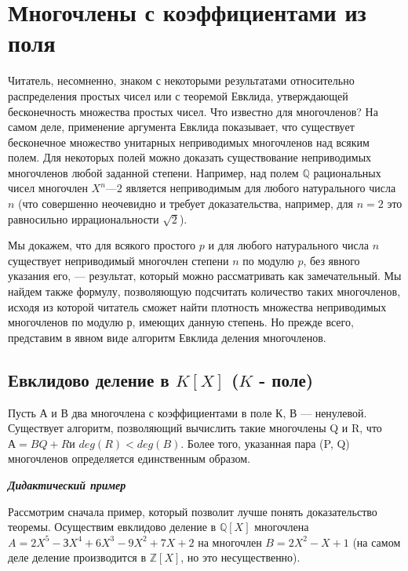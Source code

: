 \documentclass{mai_book}
\begin{document}
\section{Многочлены с коэффициентами из поля}
Читатель, несомненно, знаком с некоторыми результатами  
относительно распределения простых чисел или с теоремой Евклида,  
утверждающей бесконечность множества простых чисел. Что известно для  
многочленов? На самом деле, применение аргумента Евклида  
показывает, что существует бесконечное множество унитарных неприводимых 
многочленов над всяким полем. Для некоторых полей можно доказать 
существование неприводимых многочленов любой заданной степени. 
Например, над полем $\mathbb{Q}$ рациональных чисел многочлен $X^n — 2$  
является неприводимым для любого натурального числа $n$ (что совершенно 
неочевидно и требует доказательства, например, для $n = 2$ это  
равносильно иррациональности $\sqrt{2}$). 

Мы докажем, что для всякого простого $p$ и для любого  
натурального числа $n$ существует неприводимый многочлен степени $n$ по модулю 
$p$, без явного указания его, — результат, который можно  
рассматривать как замечательный. Мы найдем также формулу, позволяющую 
подсчитать количество таких многочленов, исходя из которой  
читатель сможет найти плотность множества неприводимых многочленов 
по модулю р, имеющих данную степень. Но прежде всего, представим 
в явном виде алгоритм Евклида деления многочленов. 
\pagebreak

\subsection{Евклидово деление в $K[X]$ ($K$ - поле)}

\begin{thm}
\hspace*{0.5cm}Пусть А и В два многочлена с коэффициентами в поле К, В —  
ненулевой. Существует алгоритм, позволяющий вычислить такие  
многочлены Q и R, что $А = BQ + R $и $deg(R) < deg(B)$. Более того, указанная 
пара (P, Q) многочленов определяется единственным образом.
\end{thm}

\noindent\textbf{\textit{Дидактический пример}}

Рассмотрим сначала пример, который позволит лучше понять  
доказательство теоремы. Осуществим евклидово деление в $\mathbb{Q}[X]$ многочлена 
$A = 2X^5 - ЗX^4 + 6X^3 - 9X^2 + 7X + 2$ на многочлен $B = 2X^2 - X + 1$ 
(на самом деле деление производится в $\mathbb{Z}[X]$, но это несущественно). 
\end{document}
